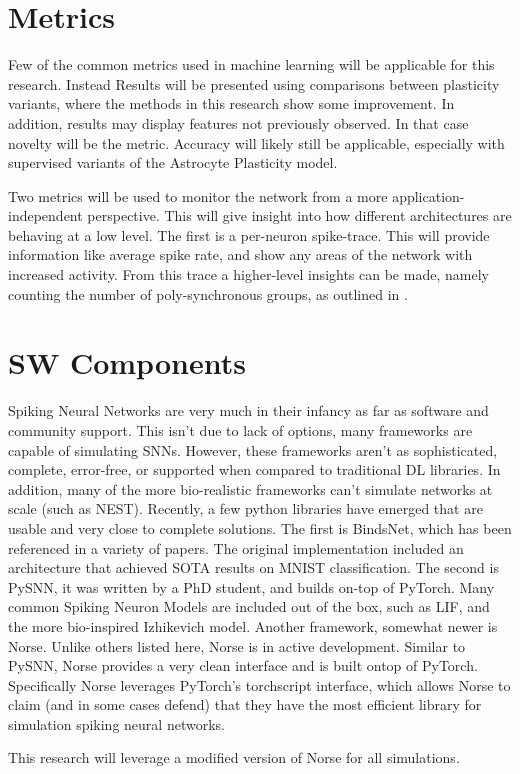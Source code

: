     \section{Metrics} \label{section:metrics}
    Few of the common metrics used in machine learning will be applicable for
    this research. Instead Results will be presented using comparisons between
    plasticity variants, where the methods in this research show some
    improvement. In addition, results may display features not previously
    observed. In that case novelty will be the metric. Accuracy will likely
    still be applicable, especially with supervised variants of the Astrocyte
    Plasticity model.
    
    Two metrics will be used to monitor the network from a more
    application-independent perspective. This will give insight into how
    different architectures are behaving at a low level. The first is a
    per-neuron spike-trace. This will provide information like average spike
    rate, and show any areas of the network with increased activity. From this
    trace a higher-level insights can be made, namely counting the number of
    poly-synchronous groups, as outlined in \cite{sgnn_transistor}.
    
    \section{SW Components}
    Spiking Neural Networks are very much in their infancy as far as software
    and community support. This isn't due to lack of options, many frameworks
    are capable of simulating SNNs. However, these frameworks aren't as
    sophisticated, complete, error-free, or supported when compared to
    traditional DL libraries. In addition, many of the more bio-realistic
    frameworks can't simulate networks at scale (such as NEST). Recently, a few
    python libraries have emerged that are usable and very close to complete
    solutions. The first is BindsNet, which has been referenced in a variety of
    papers. The original implementation included an architecture that achieved
    SOTA results on MNIST classification. The second is PySNN, it was written by
    a PhD student, and builds on-top of PyTorch. Many common Spiking Neuron
    Models are included out of the box, such as LIF, and the more bio-inspired
    Izhikevich model. Another framework, somewhat newer is Norse. Unlike others
    listed here, Norse is in active development. Similar to PySNN, Norse
    provides a very clean interface and is built ontop of PyTorch. Specifically
    Norse leverages PyTorch's torchscript interface, which allows Norse to claim
    (and in some cases defend) that they have the most efficient library for
    simulation spiking neural networks.

    This research will leverage a modified version of Norse for all simulations.
    

